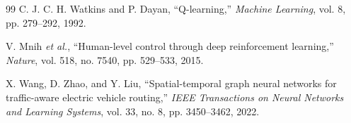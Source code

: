 \documentclass[conference]{IEEEtran}
\begin{document}
\begin{thebibliography}{99}
C. J. C. H. Watkins and P. Dayan, ``Q-learning,'' \emph{Machine Learning}, vol. 8, pp. 279--292, 1992.

V. Mnih \emph{et al.}, ``Human-level control through deep reinforcement learning,'' \emph{Nature}, vol. 518, no. 7540, pp. 529--533, 2015.

X. Wang, D. Zhao, and Y. Liu, ``Spatial-temporal graph neural networks for traffic-aware electric vehicle routing,'' \emph{IEEE Transactions on Neural Networks and Learning Systems}, vol. 33, no. 8, pp. 3450--3462, 2022.

\end{thebibliography}
\end{document}
